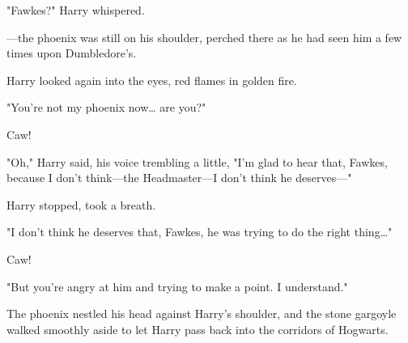 "Fawkes?" Harry whispered.

---the phoenix was still on his shoulder, perched there as he had seen him a 
few times upon Dumbledore's.

Harry looked again into the eyes, red flames in golden fire.

"You're not my phoenix now{\ldots} are you?"

Caw!

"Oh," Harry said, his voice trembling a little, "I'm glad to hear that, Fawkes, 
because I don't think---the Headmaster---I don't think he deserves---"

Harry stopped, took a breath.

"I don't think he deserves that, Fawkes, he was trying to do the right 
thing{\ldots}"

Caw!

"But you're angry at him and trying to make a point. I understand."

The phoenix nestled his head against Harry's shoulder, and the stone gargoyle 
walked smoothly aside to let Harry pass back into the corridors of Hogwarts.